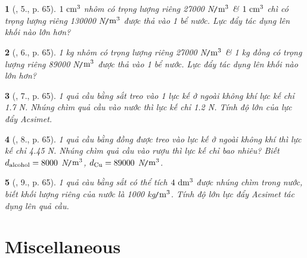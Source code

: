 \documentclass{article}
\newtheorem{baitoan}{}
\begin{document}
\begin{baitoan}[\cite{Van_Quyen_Hanh_Nhu_10_chuyen_Ly}, 5., p. 65]
	$\rm1\ cm^3$ nhôm có trọng lượng riêng {\rm27000 N{\tt/}$\rm m^3$} \& $\rm1\ cm^3$ chì có trọng lượng riêng {\rm130000 N{\tt/}$\rm m^3$} được thả vào 1 bể nước. Lực đẩy tác dụng lên khối nào lớn hơn?
\end{baitoan}

\begin{baitoan}[\cite{Van_Quyen_Hanh_Nhu_10_chuyen_Ly}, 6., p. 65]
	{\rm 1 kg} nhôm có trọng lượng riêng {\rm27000 N{\tt/}$\rm m^3$} \& {\rm1 kg} đồng có trọng lượng riêng {\rm89000 N{\tt/}$\rm m^3$} được thả vào 1 bể nước. Lực đẩy tác dụng lên khối nào lớn hơn?
\end{baitoan}

\begin{baitoan}[\cite{Van_Quyen_Hanh_Nhu_10_chuyen_Ly}, 7., p. 65]
	1 quả cầu bằng sắt treo vào 1 lực kế ở ngoài không khí lực kế chỉ {\rm1.7 N}. Nhúng chìm quả cầu vào nước thì lực kế chỉ {\rm1.2 N}. Tính độ lớn của lực đẩy Acsimet.
\end{baitoan}

\begin{baitoan}[\cite{Van_Quyen_Hanh_Nhu_10_chuyen_Ly}, 8., p. 65]
	1 quả cầu bằng đồng được treo vào lực kế ở ngoài không khí thì lực kế chỉ {\rm4.45 N}. Nhúng chìm quả cầu vào rượu thì lực kế chỉ bao nhiêu? Biết $d_{\rm alcohol} = 8000$ {\rm N{\tt/}$\rm m^3$}, $d_{\rm Cu} = 89000$ {\rm N{\tt/}$\rm m^3$}.
\end{baitoan}

\begin{baitoan}[\cite{Van_Quyen_Hanh_Nhu_10_chuyen_Ly}, 9., p. 65]
	1 quả càu bằng sắt có thể tích $\rm4\ dm^3$ được nhúng chìm trong nước, biết khối lượng riêng của nước là {\rm1000 kg{\tt/}$\rm m^3$}. Tính độ lớn lực đẩy Acsimet tác dụng lên quả cầu.
\end{baitoan}


\section{Miscellaneous}


\printbibliography[heading=bibintoc]
	
\end{document}
